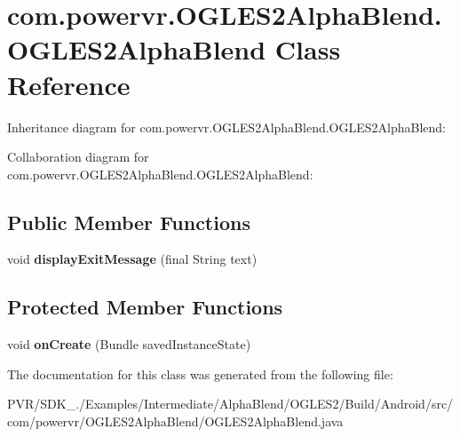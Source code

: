 \hypertarget{classcom_1_1powervr_1_1_o_g_l_e_s2_alpha_blend_1_1_o_g_l_e_s2_alpha_blend}{\section{com.\+powervr.\+O\+G\+L\+E\+S2\+Alpha\+Blend.\+O\+G\+L\+E\+S2\+Alpha\+Blend Class Reference}
\label{classcom_1_1powervr_1_1_o_g_l_e_s2_alpha_blend_1_1_o_g_l_e_s2_alpha_blend}
}


Inheritance diagram for com.\+powervr.\+O\+G\+L\+E\+S2\+Alpha\+Blend.\+O\+G\+L\+E\+S2\+Alpha\+Blend\+:


Collaboration diagram for com.\+powervr.\+O\+G\+L\+E\+S2\+Alpha\+Blend.\+O\+G\+L\+E\+S2\+Alpha\+Blend\+:
\subsection*{Public Member Functions}
\begin{DoxyCompactItemize}
\item 
\hypertarget{classcom_1_1powervr_1_1_o_g_l_e_s2_alpha_blend_1_1_o_g_l_e_s2_alpha_blend_a23c7098fa70dee6ca1ddf0c20c74d970}{void {\bfseries display\+Exit\+Message} (final String text)}\label{classcom_1_1powervr_1_1_o_g_l_e_s2_alpha_blend_1_1_o_g_l_e_s2_alpha_blend_a23c7098fa70dee6ca1ddf0c20c74d970}

\end{DoxyCompactItemize}
\subsection*{Protected Member Functions}
\begin{DoxyCompactItemize}
\item 
\hypertarget{classcom_1_1powervr_1_1_o_g_l_e_s2_alpha_blend_1_1_o_g_l_e_s2_alpha_blend_a6961ac0dce2895af4858fed9cd8a7802}{void {\bfseries on\+Create} (Bundle saved\+Instance\+State)}\label{classcom_1_1powervr_1_1_o_g_l_e_s2_alpha_blend_1_1_o_g_l_e_s2_alpha_blend_a6961ac0dce2895af4858fed9cd8a7802}

\end{DoxyCompactItemize}


The documentation for this class was generated from the following file\+:\begin{DoxyCompactItemize}
\item 
P\+V\+R/\+S\+D\+K\+\_./\+Examples/\+Intermediate/\+Alpha\+Blend/\+O\+G\+L\+E\+S2/\+Build/\+Android/src/com/powervr/\+O\+G\+L\+E\+S2\+Alpha\+Blend/O\+G\+L\+E\+S2\+Alpha\+Blend.\+java\end{DoxyCompactItemize}
